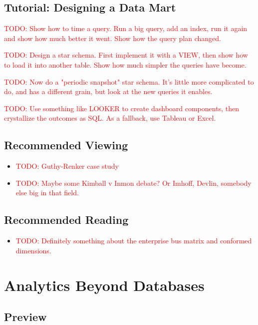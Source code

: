 \documentclass[11pt]{book}
\newcommand{\todo}[1]{\textcolor{red}{TODO: #1}} %
\begin{document}
\section*{Tutorial: Designing a Data Mart}

\todo{Show how to time a query.  Run a big query, add an index, run it again and show how much better it went.  Show how the query plan changed.}

\todo{Design a star schema.  First implement it with a VIEW, then show how to load it into another table.  Show how much simpler the queries have become.}

\todo{Now do a "periodic snapshot" star schema.  It's little more complicated to do, and has a different grain, but look at the new queries it enables.}

\todo{Use something like LOOKER to create dashboard components, then crystallize the outcomes as SQL.  As a fallback, use Tableau or Excel.}

\section*{Recommended Viewing}
\begin{itemize}
    \item \todo{Guthy-Renker case study}
    \item \todo{Maybe some Kimball v Inmon debate?  Or Imhoff, Devlin, somebody else big in that field.}
\end{itemize}

\section*{Recommended Reading}
\begin{itemize}
    \item \todo{Definitely something about the enterprise bus matrix and conformed dimensions.}
\end{itemize}









\chapter{Analytics Beyond Databases}

\section*{Preview}
\end{document}

